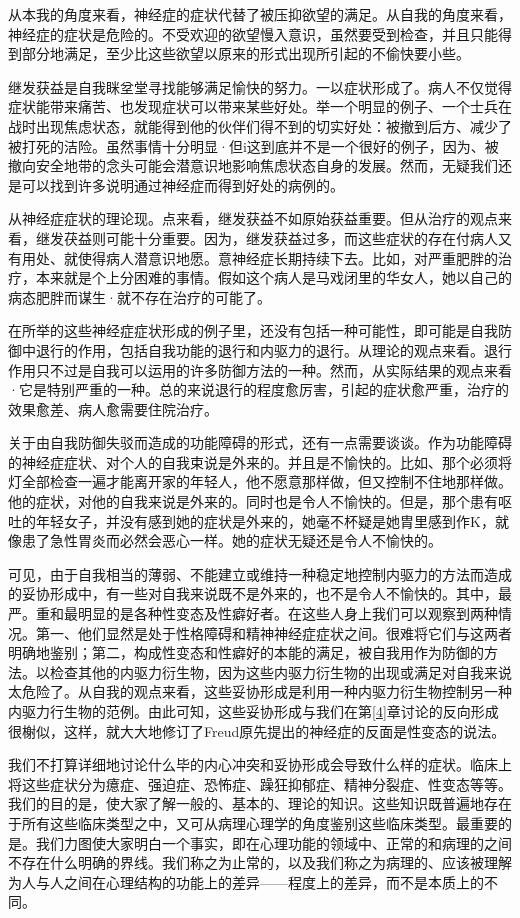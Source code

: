 \documentclass[UTF8,10pt,a4paper,openany]{book}
\begin{document}
从本我的角度来看，神经症的症状代替了被压抑欲望的满足。从自我的角度来看，神经症的症状是危险的。不受欢迎的欲望慢入意识，虽然要受到检查，并且只能得到部分地满足，至少比这些欲望以原来的形式出现所引起的不偷快要小些。

继发获益是自我眯坌堂寻找能够满足愉快的努力。一以症状形成了。病人不仅觉得症状能带来痛苦、也发现症状可以带来某些好处。举一个明显的例子、一个士兵在战时出现焦虑状态，就能得到他的伙伴们得不到的切实好处：被撤到后方、减少了被打死的洁险。虽然事情十分明显·但i这到底并不是一个很好的例子，因为、被撤向安全地带的念头可能会潜意识地影响焦虑状态自身的发展。然而，无疑我们还是可以找到许多说明通过神经症而得到好处的病例的。

从神经症症状的理论现。点来看，继发获益不如原始获益重要。但从治疗的观点来看，继发茯益则可能十分重要。因为，继发获益过多，而这些症状的存在付病人又有用处、就使得病人潜意识地愿。意神经症长期持续下去。比如，对严重肥胖的治疗，本来就是个上分困难的事情。假如这个病人是马戏闭里的华女人，她以自己的病态肥胖而谋生·就不存在治疗的可能了。

在所举的这些神经症症状形成的例子里，还没有包括一种可能性，即可能是自我防御中退行的作用，包括自我功能的退行和内驱力的退行。从理论的观点来看。退行作用只不过是自我可以运用的许多防御方法的一种。然而，从实际结果的观点来看·它是特别严重的一种。总的来说退行的程度愈厉害，引起的症状愈严重，治疗的效果愈差、病人愈需要住院治疗。

关于由自我防御失驳而造成的功能障碍的形式，还有一点需要谈谈。作为功能障碍的神经症症状、对个人的自我束说是外来的。并且是不愉快的。比如、那个必须将灯全部检查一遍才能离开家的年轻人，他不愿意那样做，但又控制不住地那样做。他的症状，对他的自我来说是外来的。同时也是令人不愉快的。但是，那个患有呕吐的年轻女子，并没有感到她的症状是外来的，她毫不杯疑是她胄里感到作K，就像患了急性胃炎而必然会恶心一样。她的症状无疑还是令人不愉快的。

可见，由于自我相当的薄弱、不能建立或维持一种稳定地控制内驱力的方法而造成的妥协形成中，有一些对自我来说既不是外来的，也不是令人不愉快的。其中，最严。重和最明显的是各种性变态及性癖好者。在这些人身上我们可以观察到两种情况。第一、他们显然是处于性格障碍和精神神经症症状之间。很难将它们与这两者明确地鉴别；第二，构成性变态和性癖好的本能的满足，被自我用作为防御的方法。以检查其他的内驱力衍生物，因为这些内驱力衍生物的出现或满足对自我来说太危险了。从自我的观点来看，这些妥协形成是利用一种内驱力衍生物控制另一种内驱力行生物的范例。由此可知，这些妥协形成与我们在第\ref{4}章讨论的反向形成很榭似，这样，就大大地修订了Freud原先提出的神经症的反面是性变态的说法。

我们不打算详细地讨论什么毕的内心冲突和妥协形成会导致什么样的症状。临床上将这些症状分为癔症、强迫症、恐怖症、躁狂抑郁症、精神分裂症、性变态等等。我们的目的是，使大家了解一般的、基本的、理论的知识。这些知识既普遍地存在于所有这些临床类型之中，又可从病理心理学的角度鉴别这些临床类型。最重要的是。我们力图使大家明白一个事实，即在心理功能的领域中、正常的和病理的之间不存在什么明确的界线。我们称之为止常的，以及我们称之为病理的、应该被理解为人与人之间在心理结构的功能上的差异——程度上的差异，而不是本质上的不同。
\end{document}
